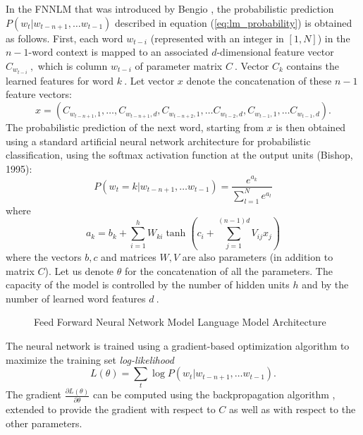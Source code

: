 In the \ac{FNNLM} that was introduced by Bengio
\cite{Bengio:2003:NPL:944919.944966},  the probabilistic prediction $P(w_t | w_{t-n+1}, \ldots w_{t-1})$ described
in equation (\ref{eq:lm_probability}) is obtained as follows. First, each word $w_{t-i}$ (represented
with an integer in $[1,N]$) in the  $n-1$-word context is mapped
to an associated $d$-dimensional feature vector $C_{w_{t-i}}\ ,$ which is
column $w_{t-i}$ of parameter matrix $C\ .$ Vector $C_k$
contains the learned features for word $k\ .$
Let vector $x$ denote the concatenation of these $n-1$
feature vectors:
\begin{equation}
  x = (C_{w_{t-n+1},1}, \ldots, C_{w_{t-n+1},d}, C_{w_{t-n+2},1}, \ldots C_{w_{t-2},d}, C_{w_{t-1},1}, \ldots C_{w_{t-1},d}).
\end{equation}
The probabilistic prediction of the next word, starting from $x$
is then obtained using a standard artificial neural network architecture
for probabilistic classification, using the softmax activation function at the output units (Bishop, 1995):
\begin{equation}
 P(w_t=k | w_{t-n+1}, \ldots w_{t-1}) = \frac{e^{a_k}}{\sum_{l=1}^N e^{a_l}}
\end{equation}
where
\begin{equation}
 a_k = b_k + \sum_{i=1}^h W_{ki} \tanh(c_i + \sum_{j=1}^{(n-1)d} V_{ij} x_j)
\end{equation}
where the vectors $b,c$ and matrices $W,V$ are also
parameters (in addition to matrix $C$). Let us denote
$\theta$ for the concatenation of all the parameters.
The capacity of the model is controlled by the number of hidden units $h$
and by the number of learned word features $d\ .$ 


\begin{figure}[h]
    \centering
    \caption{Feed Forward Neural Network Model Language Model Architecture}
    \label{fig:NNLM_architecture}
\end{figure}

The neural network is trained using a gradient-based optimization algorithm
to maximize the training set \textit{log-likelihood}
\begin{equation}
 L(\theta) = \sum_t \log P(w_t | w_{t-n+1}, \ldots w_{t-1}) .
\end{equation}
The gradient $\frac{\partial L(\theta)}{\partial \theta}$
can be computed using the backpropagation algorithm \cite{Bishop:1995:NNP:525960}, extended
to provide the gradient with respect to $C$ as well as with
respect to the other parameters. 


